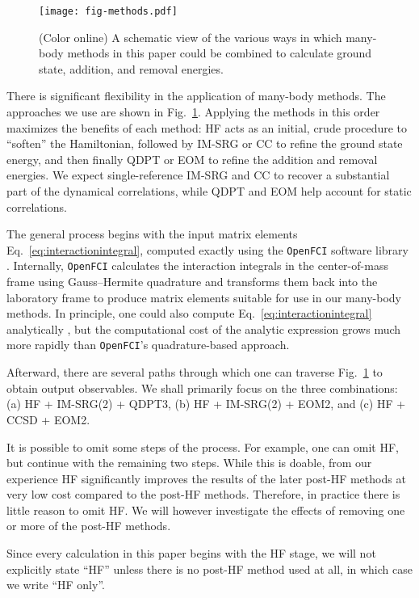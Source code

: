 \documentclass[aip, jcp, 12pt]{revtex4-1}
\begin{document}
\begin{figure}
  \centering
  \texttt{[image: fig-methods.pdf]}
  \caption{(Color online) A schematic view of the various ways in which many-body methods in this paper could be combined to calculate ground state, addition, and removal energies.}
  \label{fig:methods}
\end{figure}

There is significant flexibility in the application of many-body methods.  The approaches we use are shown in Fig.\ \ref{fig:methods}.  Applying the methods in this order maximizes the benefits of each method: HF acts as an initial, crude procedure to ``soften'' the Hamiltonian, followed by IM-SRG or CC to refine the ground state energy, and then finally QDPT or EOM to refine the addition and removal energies.  We expect single-reference IM-SRG and CC to recover a substantial part of the dynamical correlations, while QDPT and EOM help account for static correlations.

The general process begins with the input matrix elements Eq.\ \eqref{eq:interactionintegral}, computed exactly using the \texttt{OpenFCI} software library \cite{2008arXiv0810.2644K}.  Internally, \texttt{OpenFCI} calculates the interaction integrals in the center-of-mass frame using Gauss--Hermite quadrature and transforms them back into the laboratory frame to produce matrix elements suitable for use in our many-body methods.  In principle, one could also compute Eq.\ \eqref{eq:interactionintegral} analytically \cite{0953-8984-10-3-013}, but the computational cost of the analytic expression grows much more rapidly than \texttt{OpenFCI}'s quadrature-based approach.

Afterward, there are several paths through which one can traverse Fig.\ \ref{fig:methods} to obtain output observables.  We shall primarily focus on the three combinations: (a) HF + IM-SRG(2) + QDPT3, (b) HF + IM-SRG(2) + EOM2, and (c) HF + CCSD + EOM2.

It is possible to omit some steps of the process.  For example, one can omit HF, but continue with the remaining two steps.  While this is doable, from our experience HF significantly improves the results of the later post-HF methods at very low cost compared to the post-HF methods.  Therefore, in practice there is little reason to omit HF.  We will however investigate the effects of removing one or more of the post-HF methods.

Since every calculation in this paper begins with the HF stage, we will not explicitly state ``HF'' unless there is no post-HF method used at all, in which case we write ``HF only''.
\end{document}
